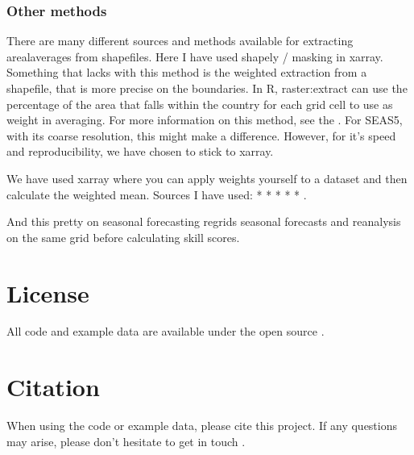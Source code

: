 \documentclass[letterpaper,10pt,english]{sphinxmanual}
\begin{document}
\subsection{Other methods}
\label{\detokenize{Notebooks/2.Preprocess/2.3Upscale:Other-methods}}
There are many different sources and methods available for extracting areal\sphinxhyphen{}averages from shapefiles. Here I have used shapely / masking in xarray. Something that lacks with this method is the weighted extraction from a shapefile, that is more precise on the boundaries. In R, raster:extract can use the percentage of the area that falls within the country for each grid cell to use as weight in averaging. For more information on this method, see the . For SEAS5, with its coarse resolution, this might make a difference. However, for it’s speed and reproducibility, we have chosen to stick to xarray.

We have used xarray where you can apply weights yourself to a dataset and then calculate the weighted mean. Sources I have used: *  *  *  *  * .

And this pretty  on seasonal forecasting regrids seasonal forecasts and reanalysis on the same grid before calculating skill scores.


\chapter{License}
\label{\detokenize{index:license}}
All code and example data are available under the open source .


\chapter{Citation}
\label{\detokenize{index:citation}}
When using the code or example data, please cite this project.
If any questions may arise, please don’t hesitate to get in touch .



\renewcommand{\indexname}{Index}
\printindex
\end{document}
